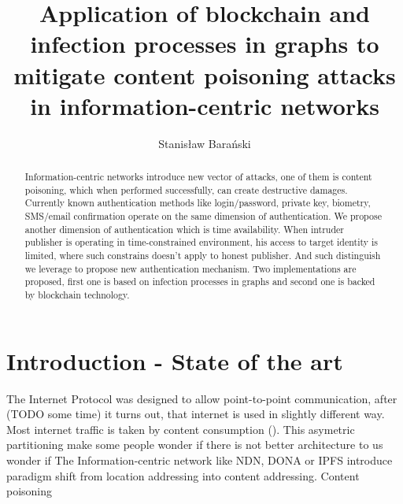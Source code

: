 \documentclass[runningheads]{llncs}
\begin{document}
%
\title{Application of blockchain and infection processes in graphs to
mitigate content poisoning attacks in information-centric networks}
%
%
\author{Stanisław Barański}

%
%
\maketitle              %
%
\begin{abstract}
Information-centric networks introduce new vector of attacks, one of them is content poisoning, which when performed successfully, can create destructive damages. Currently known authentication methods like login/password, private key, biometry, SMS/email confirmation operate on the same dimension of authentication. We propose another dimension of authentication which is time availability. When intruder publisher is operating in time-constrained environment, his access to target identity is limited, where such constrains doesn't apply to honest publisher. And such distinguish we leverage to propose new authentication mechanism. Two implementations are proposed, first one is based on infection processes in graphs and second one is backed by blockchain technology. 

\end{abstract}


\section{Introduction - State of the art}
The Internet Protocol was designed to allow point-to-point communication, after (TODO some time) it turns out, that internet is used in slightly different way. Most internet traffic is taken by content  consumption (). This asymetric partitioning make some people wonder if there is not better architecture to  us wonder if  
The Information-centric network like NDN, DONA or IPFS introduce paradigm shift from location addressing into content addressing. 
Content poisoning 
\end{document}
